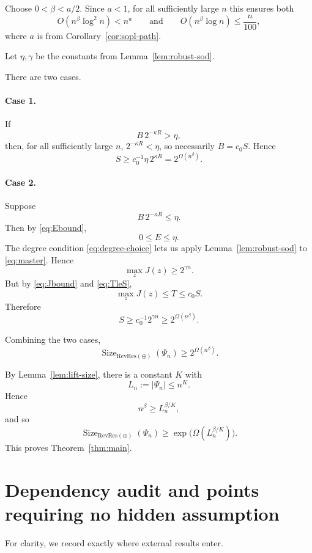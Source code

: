 \documentclass[11pt]{article}
\theoremstyle{definition}
\newcommand{\RevRes}{\mathrm{RevRes}}
\begin{document}
Choose $0<\beta<a/2$.  Since $a<1$, for all sufficiently large $n$ this ensures both
\[
  O(n^\beta\log^2 n)<n^a
  \qquad\text{and}\qquad
  O(n^\beta\log n)\le \frac n{100},
  \tag{7.2}\label{eq:degree-choice}
\]
where $a$ is from Corollary~\ref{cor:sopl-path}.

Let $\eta,\gamma$ be the constants from Lemma~\ref{lem:robust-sod}.

There are two cases.

\paragraph{Case 1.}
If
\[
  B\,2^{-\kappa R}>\eta,
\]
then, for all sufficiently large $n$, $2^{-\kappa R}<\eta$, so necessarily
$B=c_0S$.  Hence
\[
  S
  \ge
  c_0^{-1}\eta\,2^{\kappa R}
  =
  2^{\Omega(n^\beta)}.
  \tag{7.3}\label{eq:case1}
\]

\paragraph{Case 2.}
Suppose
\[
  B\,2^{-\kappa R}\le\eta.
\]
Then by \eqref{eq:Ebound},
\[
  0\le E\le\eta.
\]
The degree condition \eqref{eq:degree-choice} lets us apply
Lemma~\ref{lem:robust-sod} to \eqref{eq:master}.  Hence
\[
  \max_zJ(z)\ge2^{\gamma n}.
\]
But by \eqref{eq:Jbound} and \eqref{eq:TleS},
\[
  \max_zJ(z)\le T\le c_0S.
\]
Therefore
\[
  S\ge c_0^{-1}2^{\gamma n}
  \ge2^{\Omega(n^\beta)}.
  \tag{7.4}\label{eq:case2}
\]

Combining the two cases,
\[
  \operatorname{Size}_{\RevRes(\oplus)}(\Psi_n)
  \ge
  2^{\Omega(n^\beta)}.
  \tag{7.5}\label{eq:nlower}
\]

By Lemma~\ref{lem:lift-size}, there is a constant $K$ with
\[
  L_n:=|\Psi_n|\le n^K.
\]
Hence
\[
  n^\beta\ge L_n^{\beta/K},
\]
and so
\[
  \operatorname{Size}_{\RevRes(\oplus)}(\Psi_n)
  \ge
  \exp\bigl(\Omega(L_n^{\beta/K})\bigr).
\]
This proves Theorem~\ref{thm:main}.

\section{Dependency audit and points requiring no hidden assumption}

For clarity, we record exactly where external results enter.
\end{document}
